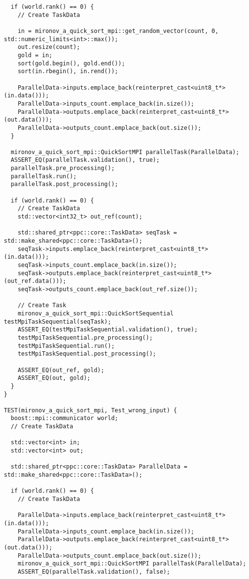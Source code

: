 \documentclass[12pt]{article}
\begin{document}
\begin{lstlisting}
  if (world.rank() == 0) {
    // Create TaskData

    in = mironov_a_quick_sort_mpi::get_random_vector(count, 0, std::numeric_limits<int>::max());
    out.resize(count);
    gold = in;
    sort(gold.begin(), gold.end());
    sort(in.rbegin(), in.rend());

    ParallelData->inputs.emplace_back(reinterpret_cast<uint8_t*>(in.data()));
    ParallelData->inputs_count.emplace_back(in.size());
    ParallelData->outputs.emplace_back(reinterpret_cast<uint8_t*>(out.data()));
    ParallelData->outputs_count.emplace_back(out.size());
  }

  mironov_a_quick_sort_mpi::QuickSortMPI parallelTask(ParallelData);
  ASSERT_EQ(parallelTask.validation(), true);
  parallelTask.pre_processing();
  parallelTask.run();
  parallelTask.post_processing();

  if (world.rank() == 0) {
    // Create TaskData
    std::vector<int32_t> out_ref(count);

    std::shared_ptr<ppc::core::TaskData> seqTask = std::make_shared<ppc::core::TaskData>();
    seqTask->inputs.emplace_back(reinterpret_cast<uint8_t*>(in.data()));
    seqTask->inputs_count.emplace_back(in.size());
    seqTask->outputs.emplace_back(reinterpret_cast<uint8_t*>(out_ref.data()));
    seqTask->outputs_count.emplace_back(out_ref.size());

    // Create Task
    mironov_a_quick_sort_mpi::QuickSortSequential testMpiTaskSequential(seqTask);
    ASSERT_EQ(testMpiTaskSequential.validation(), true);
    testMpiTaskSequential.pre_processing();
    testMpiTaskSequential.run();
    testMpiTaskSequential.post_processing();

    ASSERT_EQ(out_ref, gold);
    ASSERT_EQ(out, gold);
  }
}

TEST(mironov_a_quick_sort_mpi, Test_wrong_input) {
  boost::mpi::communicator world;
  // Create TaskData

  std::vector<int> in;
  std::vector<int> out;

  std::shared_ptr<ppc::core::TaskData> ParallelData = std::make_shared<ppc::core::TaskData>();

  if (world.rank() == 0) {
    // Create TaskData

    ParallelData->inputs.emplace_back(reinterpret_cast<uint8_t*>(in.data()));
    ParallelData->inputs_count.emplace_back(in.size());
    ParallelData->outputs.emplace_back(reinterpret_cast<uint8_t*>(out.data()));
    ParallelData->outputs_count.emplace_back(out.size());
    mironov_a_quick_sort_mpi::QuickSortMPI parallelTask(ParallelData);
    ASSERT_EQ(parallelTask.validation(), false);


\end{lstlisting}
\end{document}
